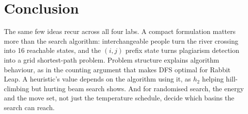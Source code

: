 \documentclass[journal]{IEEEtran}
\begin{document}
\section{Conclusion}
The same few ideas recur across all four labs. A compact formulation matters more than the
search algorithm: interchangeable people turn the river crossing into 16 reachable states, and
the $(i,j)$ prefix state turns plagiarism detection into a grid shortest-path problem. Problem
structure explains algorithm behaviour, as in the counting argument that makes DFS optimal for
Rabbit Leap. A heuristic's value depends on the algorithm using it, as $h_2$ helping
hill-climbing but hurting beam search shows. And for randomised search, the energy and the move
set, not just the temperature schedule, decide which basins the search can reach.



\end{document}
